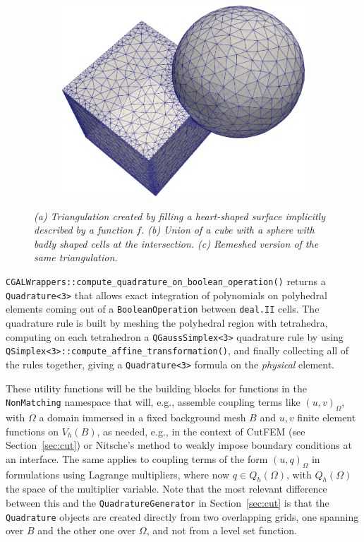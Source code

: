 \documentclass{ansarticle-preprint}
\newcommand{\specialword}[1]{\texttt{#1}}
\newcommand{\dealii}{{\specialword{deal.II}}\xspace}
\begin{document}
\begin{figure}
\begin{subfigure}[b]{0.28\textwidth}
    \caption{\label{fig:corefinement}}
  \end{subfigure}
  \hfill
  \begin{subfigure}[b]{0.35\textwidth}
    \centering
    \includegraphics[width=\textwidth]{png/cube_sphere_remeshed.png}
    \caption{ \label{fig:corefinement_remeshed}}
  \end{subfigure}
  \caption{\it (a) Triangulation created by filling a heart-shaped surface implicitly described by a function $f$. (b) Union of a cube with a sphere with badly shaped cells at the intersection. (c) Remeshed version of the same triangulation.}
\end{figure}

\texttt{CGALWrappers::compute\_quadrature\_on\_boolean\_operation()} returns a \texttt{Quadrature<3>} that allows exact integration of polynomials on polyhedral elements coming out of a \texttt{BooleanOperation} between \dealii cells.
The quadrature rule is built by meshing the polyhedral region with tetrahedra, computing on each tetrahedron a \texttt{QGaussSimplex<3>} quadrature rule by using \texttt{QSimplex<3>::\allowbreak{}compute\_affine\_transformation()}, and finally
collecting all of the rules together, giving a \texttt{Quadrature<3>} formula on the \emph{physical} element.


These utility functions will be the building blocks for functions in the \texttt{NonMatching} namespace that will, e.g.,  assemble coupling terms like $(u,v)_{\Omega}$, with $\Omega$ a domain immersed in a fixed background mesh $B$ and $u,v$ finite element functions on $V_h(B)$, as needed, e.g., in 
the context of CutFEM (see Section~\ref{sec:cut}) or Nitsche's method to weakly impose boundary conditions at an interface. The same applies to coupling terms of the form $(u,q)_{\Omega}$ in formulations using Lagrange multipliers, where now $q \in Q_h(\Omega)$, with $Q_h(\Omega)$ the space of the multiplier variable.
Note that the most relevant difference between this and the \texttt{QuadratureGenerator} in Section~\ref{sec:cut} is that the \texttt{Quadrature} objects are created directly from two overlapping grids, one
spanning over $B$ and the other one over $\Omega$, and not from a level set function.
\end{document}
